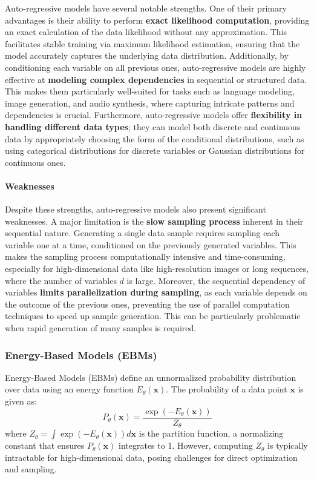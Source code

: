 Auto-regressive models have several notable strengths. One of their primary advantages is their ability to perform \textbf{exact likelihood computation}, providing an exact calculation of the data likelihood without any approximation. This facilitates stable training via maximum likelihood estimation, ensuring that the model accurately captures the underlying data distribution. Additionally, by conditioning each variable on all previous ones, auto-regressive models are highly effective at \textbf{modeling complex dependencies} in sequential or structured data. This makes them particularly well-suited for tasks such as language modeling, image generation, and audio synthesis, where capturing intricate patterns and dependencies is crucial. Furthermore, auto-regressive models offer \textbf{flexibility in handling different data types}; they can model both discrete and continuous data by appropriately choosing the form of the conditional distributions, such as using categorical distributions for discrete variables or Gaussian distributions for continuous ones.

\paragraph{Weaknesses}

Despite these strengths, auto-regressive models also present significant weaknesses. A major limitation is the \textbf{slow sampling process} inherent in their sequential nature. Generating a single data sample requires sampling each variable one at a time, conditioned on the previously generated variables. This makes the sampling process computationally intensive and time-consuming, especially for high-dimensional data like high-resolution images or long sequences, where the number of variables \( d \) is large. Moreover, the sequential dependency of variables \textbf{limits parallelization during sampling}, as each variable depends on the outcome of the previous ones, preventing the use of parallel computation techniques to speed up sample generation. This can be particularly problematic when rapid generation of many samples is required.


\subsubsection{Energy-Based Models (EBMs)}\label{sec:energy_based_models}

Energy-Based Models (EBMs) \cite{lecun2006tutorial} define an unnormalized probability distribution over data using an energy function \( E_{\theta}(\mathbf{x}) \). The probability of a data point \( \mathbf{x} \) is given as:
\[
P_{\theta}(\mathbf{x}) = \frac{\exp(-E_{\theta}(\mathbf{x}))}{Z_{\theta}}
\]
where \( Z_{\theta} = \int \exp(-E_{\theta}(\mathbf{x})) d\mathbf{x} \) is the partition function, a normalizing constant that ensures \( P_{\theta}(\mathbf{x}) \) integrates to 1. However, computing \( Z_{\theta} \) is typically intractable for high-dimensional data, posing challenges for direct optimization and sampling.

